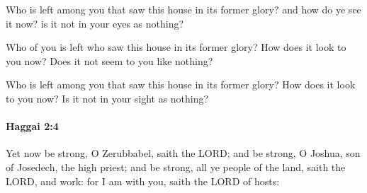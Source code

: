 			\begin{versebox}
					\item[BHS] 
					\item[LXX] 
					\item[ASV] Who is left among you that saw this house in its former glory? and how do ye see it now? is it not in your eyes as nothing?
					\item[NIV] Who of you is left who saw this house in its former glory? How does it look to you now? Does it not seem to you like nothing?
					\item[NRSV] Who is left among you that saw this house in its former glory? How does it look to you now? Is it not in your sight as nothing?
			\end{versebox}

		\paragraph{Haggai 2:4} %
			\label{HAGGAI-2-4}

			Yet now be strong, O Zerubbabel, saith the LORD; and be strong, O Joshua, son of Josedech, the high priest; and be strong, all ye people of the land, saith the LORD, and work: for I am with you, saith the LORD of hosts:

